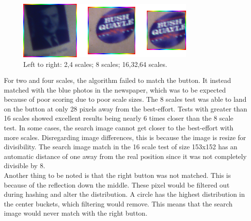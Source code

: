 \documentclass[10pt, journal]{vgtc}                %
\newcommand\tab[1][1cm]{\hspace*{#1}}
\begin{document}
\begin{flushleft}
	\begin{figure}[h!]
		\centering
		\includegraphics[width=3.5in]{cropped.png}
		\caption{Left to right: 2,4 scales; 8 scales; 16,32,64 scales.}
	\end{figure}
	\tab For two and four scales, the algorithm failed to match the button. It instead matched with the blue photos in the newspaper, which was to be expected because of poor scoring due to poor scale sizes. The 8 scales test was able to land on the button at only 28 pixels away from the best-effort. Tests with greater than 16 scales showed excellent results being nearly 6 times closer than the 8 scale test. In some cases, the search image cannot get closer to the best-effort with more scales. Disregarding image differences, this is because the image is resize for divisibility. The search image match in the 16 scale test of size 153x152 has an automatic distance of one away from the real position since it was not completely divisible by 8.\\\smallskip
\tab Another thing to be noted is that the right button was not matched. This is because of the reflection down the middle. These pixel would be filtered out during hashing and alter the distribution. A circle has the highest distribution in the center buckets, which filtering would remove. This means that the search image would never match with the right button.
	
\end{flushleft}
\end{document}
